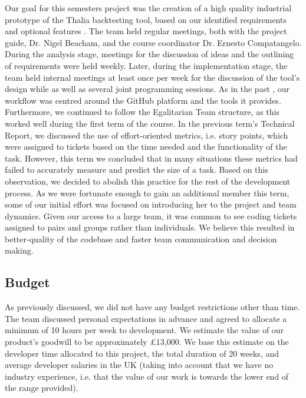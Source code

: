 \documentclass[main.tex]{subfiles}
\begin{document}
Our goal for this semesters project was the creation of a high quality industrial prototype of the Thalia backtesting tool, based on our identified requirements and optional features \cite{TR}. The team held regular meetings, both with the project guide, Dr. Nigel Beacham, and the course coordinator Dr. Ernesto Compatangelo. During the analysis stage, meetings for the discussion of ideas and the outlining of requirements were held weekly. Later, during the implementation stage, the team held internal meetings at least once per week for the discussion of the tool's design while as well as several joint programming sessions. \newline \newline
As in the past \cite{TR}, our workflow was centred around the GitHub platform and the tools it provides.
Furthermore, we continued to follow the Egalitarian Team structure, as this worked well during the first term of the course.
In the previous term's Technical Report, we discussed the use of effort-oriented metrics, i.e. story points, which were assigned to tickets based on the time needed and the functionality of the task.
However, this term we concluded that in many situations these metrics had failed to accurately measure and predict the size of a task. Based on this observation, we decided to abolish this practice for the rest of the development process. \newline \newline
As we were fortunate enough to gain an additional member this term, some of our initial effort was focused on introducing her to the project and team dynamics. Given our access to a large team, it was common to see coding tickets assigned to pairs and groups rather than individuals. We believe this resulted in better-quality of the codebase and faster team communication and decision making.

\subsection{Budget}
As previously discussed, we did not have any budget restrictions other than time. The team discussed personal expectations in advance and agreed to allocate a minimum of 10 hours per week to development. We estimate the value of our product's goodwill to be approximately £13,000. We base this estimate on the developer time allocated to this project, the total duration of 20 weeks, and average developer salaries in the UK \cite{DeveloperSalary} (taking into account that we have no industry experience, i.e. that the value of our work is towards the lower end of the range provided).
\end{document}
